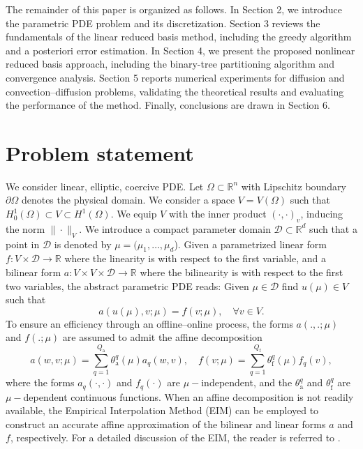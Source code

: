 \documentclass[12pt]{article}
\theoremstyle{remark}
\theoremstyle{definition}
\numberwithin{equation}{section}
\begin{document}
The remainder of this paper is organized as follows. In Section 2, we introduce the parametric PDE problem and its discretization.  Section 3 reviews the fundamentals of the linear reduced basis method, including the greedy algorithm and a posteriori error estimation. In Section 4, we present the proposed nonlinear reduced basis approach, including the binary-tree partitioning algorithm and convergence analysis. Section 5 reports numerical experiments for diffusion and convection–diffusion problems, validating the theoretical results and evaluating the performance of the method. Finally, conclusions are drawn in Section 6.

\section{Problem statement}
We consider linear, elliptic, coercive PDE. Let $\Omega \subset \mathbb{R}^n$ with Lipschitz boundary $\partial \Omega$ denotes the physical domain. We consider a space $V=V(\Omega)$ such that $H_0^1(\Omega) \subset  V \subset H^1(\Omega)$. We equip $V$ with the inner product $(\cdot,\cdot)_v$, inducing the norm $\|\cdot\|_V$. We introduce a compact parameter domain $\mathcal{D} \subset \mathbb{R}^d$ such that a point in $\mathcal{D}$ is denoted by $\mu=(\mu_1,\dots, \mu_d$). Given a parametrized linear form $f: V \times \mathcal{D} \rightarrow \mathbb{R}$ where the linearity is with respect to the first variable, and a bilinear form $a: V \times V \times \mathcal{D} \rightarrow \mathbb{R}$ where the bilinearity is with respect to the first two variables, the abstract parametric PDE reads: Given $\mu \in \mathcal{D}$ find $u(\mu) \in V$ such that
\begin{equation}
    a(u(\mu), v ; \mu)=f(v ; \mu), \quad \forall v \in V.
    \label{para pde}
\end{equation}
To ensure an efficiency through an offline–online process, the forms $a(.,.;\mu)$ and $f(.;\mu)$ are assumed to admit the affine decomposition
\begin{equation}
    a(w, v ; \mu) =\sum_{q=1}^{Q_{\mathrm{a}}} \theta_{\mathrm{a}}^q(\mu) a_q(w, v), \quad
    f(v ; \mu) =\sum_{q=1}^{Q_{\mathrm{f}}} \theta_{\mathrm{f}}^q(\mu) f_q(v), \label{aff 2} 
\end{equation}
where the forms $a_q(\cdot, \cdot)$ and $f_q(\cdot)$ are $\mu-$independent, and the $\theta_{\mathrm{a}}^q$ and $\theta_{\mathrm{f}}^q$ are $\mu-$dependent continuous functions. When an affine decomposition is not readily available, the Empirical Interpolation Method (EIM) can be employed to construct an accurate affine approximation of the bilinear and linear forms $a$ and $f$, respectively. For a detailed discussion of the EIM, the reader is referred to \cite{barrault2004empirical, grepl2007efficient,eftang2010posteriori}.
\end{document}
